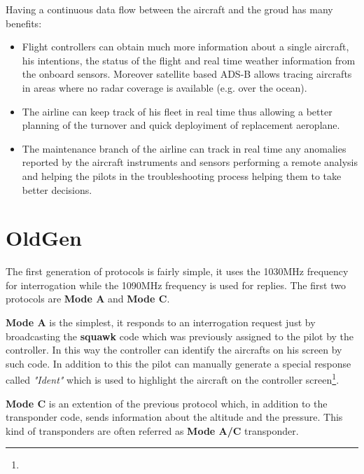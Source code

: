 \documentclass[../main.tex]{subfiles}
\begin{document}
Having a continuous data flow between the aircraft and the groud has many benefits:
\begin{itemize}
  \item Flight controllers can obtain much more information about a single aircraft, his intentions, the status of the flight and real time weather information from the onboard sensors. Moreover satellite based ADS-B allows tracing aircrafts in areas where no radar coverage is available (e.g. over the ocean).
  \item The airline can keep track of his fleet in real time thus allowing a better planning of the turnover and quick deployiment of replacement aeroplane.
  \item The maintenance branch of the airline can track in real time any anomalies reported by the aircraft instruments and sensors performing a remote analysis and helping the pilots in the troubleshooting process helping them to take better decisions.
\end{itemize}


\section{OldGen}

The first generation of protocols is fairly simple, it uses the 1030MHz frequency for interrogation while the 1090MHz frequency is used for replies.
The first two protocols are \textbf{Mode A} and \textbf{Mode C}.

\textbf{Mode A} is the simplest, it responds to an interrogation request just by broadcasting the \textbf{squawk} code which was previously assigned to the pilot by the controller. In this way the controller can identify the aircrafts on his screen by such code. In addition to this the pilot can manually generate a special response called \textit{"Ident"} which is used to highlight the aircraft on the controller screen\footnote{}.

\textbf{Mode C} is an extention of the previous protocol which, in addition to the transponder code, sends information about the altitude and the pressure. This kind of transponders are often referred as \textbf{Mode A/C} transponder.
\end{document}
